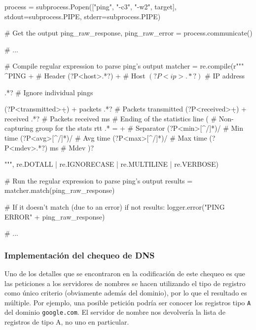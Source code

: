\begin{pythoncode}
process = subprocess.Popen(["ping", "-c3", "-w2", target], 
                           stdout=subprocess.PIPE, 
                           stderr=subprocess.PIPE)

# Get the output
ping_raw_response, ping_raw_error = process.communicate()

# ...

# Compile regular expression to parse ping's output
matcher = re.compile(r"""
^PING \s+                            # Header
(?P<host>.*?) \s+                    # Host
\((?P<ip>.*?)\)                      # IP address

.*?                                  # Ignore individual pings

(?P<transmitted>\d+) \s+ packets       .*?       # Packets transmitted
(?P<received>\d+) \s+ received         .*?       # Packets received
ms                                     \s*       # Ending of the statistics line
(                                    # Non-capturing group for the stats
rtt .* = \s+                         # Separator
(?P<min>[^/]*)/                      # Min time
(?P<avg>[^/]*)/                      # Avg time
(?P<max>[^/]*)/                      # Max time
(?P<mdev>.*?) \s ms                  # Mdev
)?

""", re.DOTALL | re.IGNORECASE | re.MULTILINE | re.VERBOSE)

# Run the regular expression to parse ping's output
results = matcher.match(ping_raw_response)

# If it doesn't match (due to an error)
if not results:
    logger.error("PING ERROR" + ping_raw_response)  

# ...
\end{pythoncode}

\subsubsection{Implementación del chequeo de DNS}

Uno de los detalles que se encontraron en la codificación de este chequeo es que
las peticiones a los servidores de nombres se hacen utilizando el tipo de
registro como único criterio (obviamente además del dominio), por lo que el
resultado es múltiple. Por ejemplo, una posible petición podría ser conocer los
registros tipo \texttt{A} del dominio \texttt{google.com}. El servidor de nombre
nos devolvería la lista de registros de tipo A, no uno en particular. 

